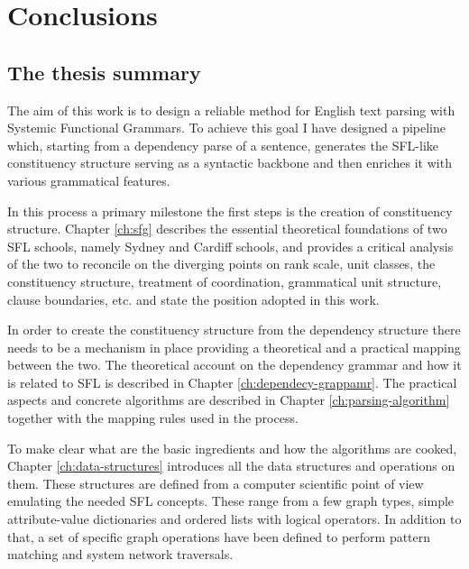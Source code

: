 \chapter{Conclusions}
\label{ch:conclusions}



\section{The thesis summary}

The aim of this work is to design a reliable method for English text parsing with Systemic Functional Grammars. To achieve this goal I have designed a pipeline which, starting from a dependency parse of a sentence, generates the SFL-like constituency structure serving as a syntactic backbone and then enriches it with various grammatical features. 

In this process a primary milestone the first steps is the creation of constituency structure. Chapter \ref{ch:sfg} describes the essential theoretical foundations of two SFL schools, namely Sydney and Cardiff schools, and provides a critical analysis of the two to reconcile on the diverging points on rank scale, unit classes, the constituency structure, treatment of coordination, grammatical unit structure, clause boundaries, etc. and state the position adopted in this work. 

In order to create the constituency structure from the dependency structure there needs to be a mechanism in place providing a theoretical and a practical mapping between the two. The theoretical account on the dependency grammar and how it is related to SFL is described in Chapter \ref{ch:dependecy-grappamr}. The practical aspects and concrete algorithms are described in Chapter \ref{ch:parsing-algorithm} together with the mapping rules used in the process. 

To make clear what are the basic ingredients and how the algorithms are cooked, Chapter \ref{ch:data-structures} introduces all the data structures and operations on them. These structures are defined from a computer scientific point of view emulating the needed SFL concepts. These range from a few graph types, simple attribute-value dictionaries and ordered lists with logical operators. In addition to that, a set of specific graph operations have been defined to perform pattern matching and system network traversals.

